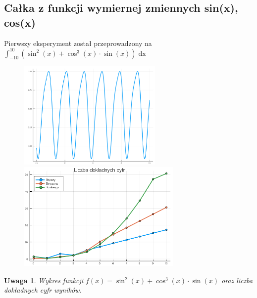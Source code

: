 \documentclass[11pt,wide]{article}
\newtheorem{remark}{Uwaga}
\begin{document}
\subsection{Całka z funkcji wymiernej zmiennych sin(x), cos(x)}
Pierwszy eksperyment został przeprowadzony na \(\displaystyle \int_{-10}^{10} (\sin^2(x) + \cos^3(x) \cdot \sin(x))\mathop{dx} \)
\begin{figure}[h!]
	\includegraphics[width=70mm,scale=0.5]{tryg1}
	\includegraphics[width=80mm,scale=0.5]{tryg_blad1}
\end{figure}
\begin{remark}
\centering
Wykres funkcji \(\displaystyle f(x) = \sin^2(x) + \cos^3(x) \cdot \sin(x) \) oraz liczba dokładnych cyfr wyników.
\end{remark}
\end{document}
